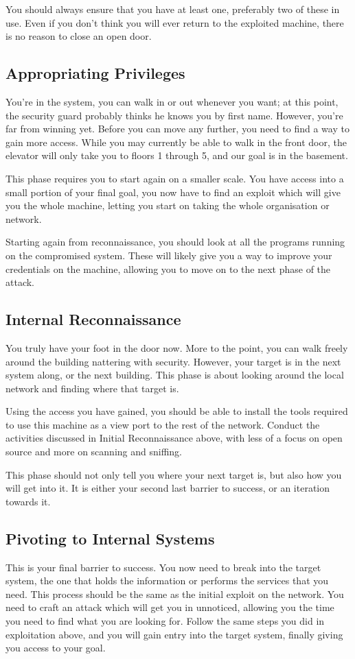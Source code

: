 			You should always ensure that you have at least one, preferably two of these in use.
			Even if you don't think you will ever return to the exploited machine, there is no reason to close an open door.
		\subsection{Appropriating Privileges}
			You're in the system, you can walk in or out whenever you want; at this point, the security guard probably thinks he knows you by first name.
			However, you're far from winning yet.
			Before you can move any further, you need to find a way to gain more access.
			While you may currently be able to walk in the front door, the elevator will only take you to floors 1 through 5, and our goal is in the basement.

			This phase requires you to start again on a smaller scale.
			You have access into a small portion of your final goal, you now have to find an exploit which will give you the whole machine, letting you start on taking the whole organisation or network.

			Starting again from reconnaissance, you should look at all the programs running on the compromised system.
			These will likely give you a way to improve your credentials on the machine, allowing you to move on to the next phase of the attack.

		\subsection{Internal Reconnaissance}
			You truly have your foot in the door now.
			More to the point, you can walk freely around the building nattering with security.
			However, your target is in the next system along, or the next building.
			This phase is about looking around the local network and finding where that target is.

			Using the access you have gained, you should be able to install the tools required to use this machine as a view port to the rest of the network.
			Conduct the activities discussed in Initial Reconnaissance above, with less of a focus on open source and more on scanning and sniffing.

			This phase should not only tell you where your next target is, but also how you will get into it.
			It is either your second last barrier to success, or an iteration towards it.
		\subsection{Pivoting to Internal Systems}
			This is your final barrier to success.
			You now need to break into the target system, the one that holds the information or performs the services that you need.
			This process should be the same as the initial exploit on the network.
			You need to craft an attack which will get you in unnoticed, allowing you the time you need to find what you are looking for.
			Follow the same steps you did in exploitation above, and you will gain entry into the target system, finally giving you access to your goal.
